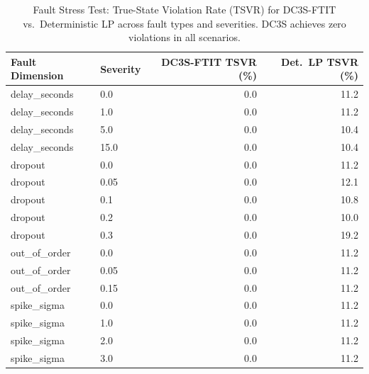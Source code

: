 \begin{table}[htbp]
\centering
\caption{Fault Stress Test: True-State Violation Rate (TSVR) for DC3S-FTIT vs.\ Deterministic LP across fault types and severities.  DC3S achieves zero violations in all scenarios.}
\label{tab:fault_stress_subset}
\begin{tabular}{llrr}
\toprule
Fault Dimension & Severity & DC3S-FTIT TSVR (\%) & Det.\ LP TSVR (\%) \\
\midrule
delay\_seconds & 0.0 & 0.0 & 11.2 \\
delay\_seconds & 1.0 & 0.0 & 11.2 \\
delay\_seconds & 5.0 & 0.0 & 10.4 \\
delay\_seconds & 15.0 & 0.0 & 10.4 \\
dropout & 0.0 & 0.0 & 11.2 \\
dropout & 0.05 & 0.0 & 12.1 \\
dropout & 0.1 & 0.0 & 10.8 \\
dropout & 0.2 & 0.0 & 10.0 \\
dropout & 0.3 & 0.0 & 19.2 \\
out\_of\_order & 0.0 & 0.0 & 11.2 \\
out\_of\_order & 0.05 & 0.0 & 11.2 \\
out\_of\_order & 0.15 & 0.0 & 11.2 \\
spike\_sigma & 0.0 & 0.0 & 11.2 \\
spike\_sigma & 1.0 & 0.0 & 11.2 \\
spike\_sigma & 2.0 & 0.0 & 11.2 \\
spike\_sigma & 3.0 & 0.0 & 11.2 \\
\bottomrule
\end{tabular}
\end{table}